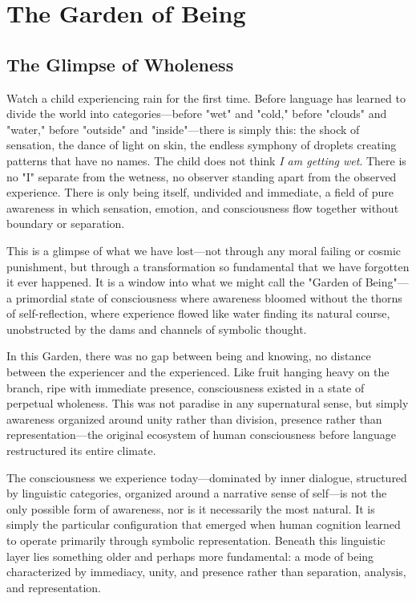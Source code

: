 \chapter{The Garden of Being}

\section{The Glimpse of Wholeness}

Watch a child experiencing rain for the first time. Before language has learned to divide the world into categories—before "wet" and "cold," before "clouds" and "water," before "outside" and "inside"—there is simply this: the shock of sensation, the dance of light on skin, the endless symphony of droplets creating patterns that have no names. The child does not think \textit{I am getting wet}. There is no "I" separate from the wetness, no observer standing apart from the observed experience. There is only being itself, undivided and immediate, a field of pure awareness in which sensation, emotion, and consciousness flow together without boundary or separation.

This is a glimpse of what we have lost—not through any moral failing or cosmic punishment, but through a transformation so fundamental that we have forgotten it ever happened. It is a window into what we might call the "Garden of Being"—a primordial state of consciousness where awareness bloomed without the thorns of self-reflection, where experience flowed like water finding its natural course, unobstructed by the dams and channels of symbolic thought.

In this Garden, there was no gap between being and knowing, no distance between the experiencer and the experienced. Like fruit hanging heavy on the branch, ripe with immediate presence, consciousness existed in a state of perpetual wholeness. This was not paradise in any supernatural sense, but simply awareness organized around unity rather than division, presence rather than representation—the original ecosystem of human consciousness before language restructured its entire climate.

The consciousness we experience today—dominated by inner dialogue, structured by linguistic categories, organized around a narrative sense of self—is not the only possible form of awareness, nor is it necessarily the most natural. It is simply the particular configuration that emerged when human cognition learned to operate primarily through symbolic representation. Beneath this linguistic layer lies something older and perhaps more fundamental: a mode of being characterized by immediacy, unity, and presence rather than separation, analysis, and representation.

